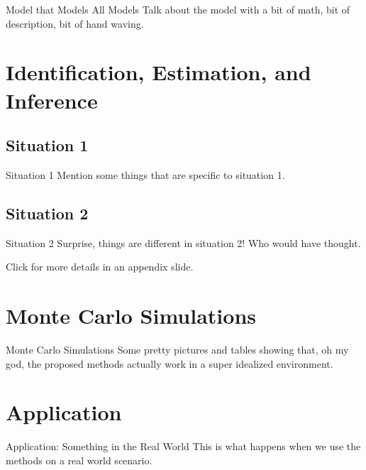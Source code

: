 \documentclass[]{beamer}
\newif\ifSectionTitlePage
\newcommand\NextSectionWithoutTitlePage{\SectionTitlePagefalse}
\begin{document}
\begin{frame}{Model that Models All Models}
	Talk about the model with a bit of math, bit of description, bit of hand waving.
\end{frame}

\NextSectionWithoutTitlePage %
\section{Identification, Estimation, and Inference}

\subsection{Situation 1}

\begin{frame}{Situation 1}
	Mention some things that are specific to situation 1.
\end{frame}

\subsection{Situation 2}

\begin{frame}[label=situation2]{Situation 2}
	Surprise, things are different in situation 2! Who would have thought.
	
	Click \hyperlink{extra_details}{} for more details in an appendix slide.
\end{frame}

\section{Monte Carlo Simulations}

\begin{frame}{Monte Carlo Simulations}
	Some pretty pictures and tables showing that, oh my god, the proposed methods actually work in a super idealized environment.
\end{frame}

\section{Application}

\begin{frame}{Application: Something in the Real World}
	This is what happens when we use the methods on a real world scenario.
\end{frame}
\end{document}
